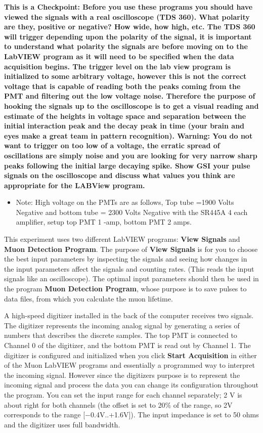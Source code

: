 \documentclass{../lab}
\begin{document}
\textbf{This is a Checkpoint: Before you use these programs you should have viewed the signals with a real oscilloscope (TDS 360). What polarity are they, positive or negative? How wide, how high, etc. The TDS 360 will trigger depending upon the polarity of the signal, it is important to understand what polarity the signals are before moving on to the LabVIEW program as it will need to be specified when the data acquisition begins. The trigger level on the lab view program is initialized to some arbitrary voltage, however this is not the correct voltage that is capable of reading both the peaks coming from the PMT and filtering out the low voltage noise. Therefore the purpose of hooking the signals up to the oscilloscope is to get a visual reading and estimate of the heights in voltage space and separation between the initial interaction peak and the decay peak in time (your brain and eyes make a great team in pattern recognition). Warning: You do not want to trigger on too low of a voltage, the erratic spread of oscillations are simply noise and you are looking for very narrow sharp peaks following the initial large decaying spike. Show  GSI your pulse signals on the oscilloscope and discuss what values you think are appropriate for the LABView program. }
\begin{itemize}
    \item Note: High voltage on the PMTs are as follows, Top tube =1900 Volts Negative and bottom tube = 2300 Volts Negative with the SR445A 4 each amplifier, setup top PMT 1 -amp, bottom PMT 2 amps.

\end{itemize}

This experiment uses two different LabVIEW programs: \textbf{View Signals} and \textbf{Muon Detection Program}. The purpose of \textbf{View Signals} is for you to choose the best input parameters by inspecting the signals and seeing how changes in the input parameters affect the signals and counting rates. (This reads the input signals like an oscilloscope). The optimal input parameters should then be used in the program \textbf{Muon Detection Program}, whose purpose is to save pulses to data files, from which you calculate the muon lifetime.

\newpage

A high-speed digitizer installed in the back of the computer receives two signals. The digitizer represents the incoming analog signal by generating a series of numbers that describes the discrete samples. The top PMT is connected to Channel 0 of the digitizer, and the bottom PMT is read out by Channel 1. The digitizer is configured and initialized when you click \textbf{Start Acquisition} in either of the Muon LabVIEW programs and essentially a programmed way to interpret the incoming signal. However since the digitizers purpose is to represent the incoming signal and process the data you can change its configuration throughout the program. You can set the input range for each channel separately; 2 V is about right for both channels (the offset is set to 20\% of the range, so 2V corresponds to the range [$-$0.4V..+1.6V]). The input impedance is set to 50 ohms and the digitizer uses full bandwidth.
\end{document}
